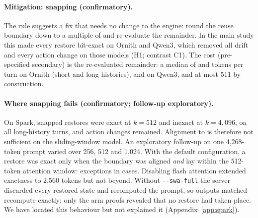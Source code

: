 \paragraph{Mitigation: snapping (confirmatory).}
The rule suggests a fix that needs no change to the engine: round the reuse
boundary down to a multiple of \nub{} and re-evaluate the remainder. In the
main study this made every restore bit-exact on Ornith and Qwen3, which removed
all drift and every action change on those models (H1; contrast C1). The cost (pre-specified secondary)
is the re-evaluated remainder: a median of \SnapCostOrnithShort{} and
\SnapCostOrnithLong{} tokens per turn on Ornith (short and long histories),
\SnapCostQwenShort{} and \SnapCostQwenLong{} on Qwen3, and at most 511 by
construction.

\paragraph{Where snapping fails (confirmatory; follow-up exploratory).}
On Spark, snapped restores were exact at $k = 512$ and inexact at $k = 4{,}096$,
on all \SnapInexactSpark{} long-history turns, and \ASparkSnapLongAmb{} action
changes remained. Alignment to \nub{} is therefore not sufficient on the
sliding-window model. An exploratory follow-up on one 4{,}268-token prompt
varied \nub{} over 256, 512 and 1{,}024.
With the default configuration, a restore was exact only when the boundary was
aligned \emph{and} lay within the 512-token attention window:
\SparkContradictions{} exceptions in \SparkCases{} cases. Disabling flash
attention extended exactness to 2{,}560 tokens but not beyond. Without
\texttt{-{}-swa-full} the server discarded every restored state and recomputed
the prompt, so outputs matched recompute exactly; only the arm proofs revealed
that no restore had taken place. We have located this behaviour but not
explained it (Appendix~\ref{app:spark}).

